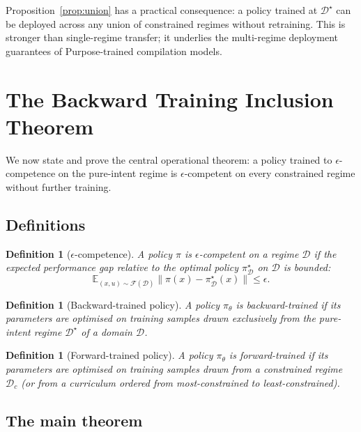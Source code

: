 \documentclass[twocolumn,11pt,a4paper]{article}
\newtheorem{definition}[theorem]{Definition}
\newcommand{\cD}{\mathcal{D}}
\newcommand{\cF}{\mathcal{F}}
\newcommand{\E}{\mathbb{E}}
\begin{document}
Proposition~\ref{prop:union} has a practical consequence: a policy trained at $\cD^\star$ can be deployed across any union of constrained regimes without retraining. This is stronger than single-regime transfer; it underlies the multi-regime deployment guarantees of Purpose-trained compilation models.


\section{The Backward Training Inclusion Theorem}
\label{sec:inclusion}

We now state and prove the central operational theorem: a policy trained to $\epsilon$-competence on the pure-intent regime is $\epsilon$-competent on every constrained regime without further training.

\subsection{Definitions}

\begin{definition}[$\epsilon$-competence]
\label{def:competence}
A policy $\pi$ is $\epsilon$-\emph{competent} on a regime $\cD$ if the expected performance gap relative to the optimal policy $\pi^\star_\cD$ on $\cD$ is bounded:
\begin{equation}
\E_{(x, u) \sim \cF(\cD)} \|\pi(x) - \pi^\star_\cD(x)\| \leq \epsilon.
\end{equation}
\end{definition}

\begin{definition}[Backward-trained policy]
\label{def:backward-trained}
A policy $\pi_\theta$ is \emph{backward-trained} if its parameters are optimised on training samples drawn exclusively from the pure-intent regime $\cD^\star$ of a domain $\cD$.
\end{definition}

\begin{definition}[Forward-trained policy]
\label{def:forward-trained}
A policy $\pi_\theta$ is \emph{forward-trained} if its parameters are optimised on training samples drawn from a constrained regime $\cD_c$ (or from a curriculum ordered from most-constrained to least-constrained).
\end{definition}

\subsection{The main theorem}
\end{document}
